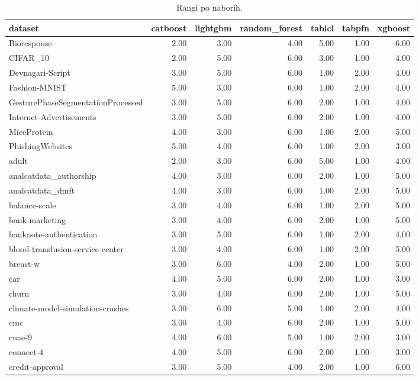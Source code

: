 \begin{table}[htbp]
\centering
\caption{Rangi po naborih.}
\label{tab:ranks}
\begin{tabular}{lrrrrrr}
\hline
dataset & catboost & lightgbm & random\_forest & tabicl & tabpfn & xgboost \\
\hline
Bioresponse & 2.00 & 3.00 & 4.00 & 5.00 & 1.00 & 6.00 \\
CIFAR\_10 & 2.00 & 5.00 & 6.00 & 3.00 & 1.00 & 4.00 \\
Devnagari-Script & 3.00 & 5.00 & 6.00 & 1.00 & 2.00 & 4.00 \\
Fashion-MNIST & 5.00 & 3.00 & 6.00 & 1.00 & 2.00 & 4.00 \\
GesturePhaseSegmentationProcessed & 3.00 & 5.00 & 6.00 & 2.00 & 1.00 & 4.00 \\
Internet-Advertisements & 3.00 & 5.00 & 6.00 & 2.00 & 1.00 & 4.00 \\
MiceProtein & 4.00 & 3.00 & 6.00 & 1.00 & 2.00 & 5.00 \\
PhishingWebsites & 5.00 & 4.00 & 6.00 & 1.00 & 2.00 & 3.00 \\
adult & 2.00 & 3.00 & 6.00 & 5.00 & 1.00 & 4.00 \\
analcatdata\_authorship & 4.00 & 3.00 & 6.00 & 2.00 & 1.00 & 5.00 \\
analcatdata\_dmft & 4.00 & 3.00 & 6.00 & 1.00 & 2.00 & 5.00 \\
balance-scale & 3.00 & 4.00 & 6.00 & 1.00 & 2.00 & 5.00 \\
bank-marketing & 3.00 & 4.00 & 6.00 & 2.00 & 1.00 & 5.00 \\
banknote-authentication & 3.00 & 5.00 & 6.00 & 1.00 & 2.00 & 4.00 \\
blood-transfusion-service-center & 3.00 & 4.00 & 6.00 & 1.00 & 2.00 & 5.00 \\
breast-w & 3.00 & 6.00 & 4.00 & 2.00 & 1.00 & 5.00 \\
car & 4.00 & 5.00 & 6.00 & 2.00 & 1.00 & 3.00 \\
churn & 3.00 & 4.00 & 6.00 & 2.00 & 1.00 & 5.00 \\
climate-model-simulation-crashes & 3.00 & 6.00 & 5.00 & 1.00 & 2.00 & 4.00 \\
cmc & 3.00 & 4.00 & 6.00 & 2.00 & 1.00 & 5.00 \\
cnae-9 & 4.00 & 6.00 & 5.00 & 1.00 & 2.00 & 3.00 \\
connect-4 & 4.00 & 5.00 & 6.00 & 2.00 & 1.00 & 3.00 \\
credit-approval & 3.00 & 5.00 & 4.00 & 2.00 & 1.00 & 6.00 \\

\end{tabular}
\end{table}
